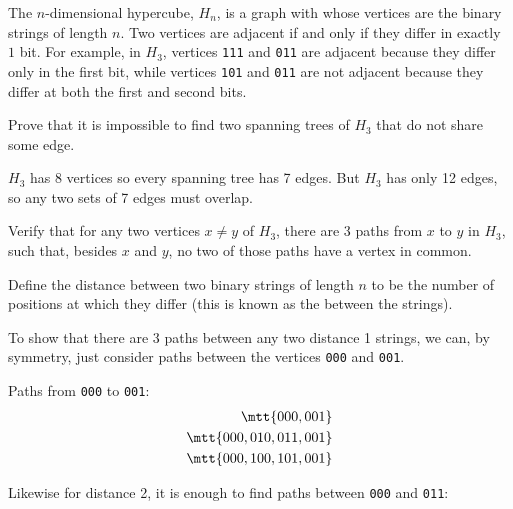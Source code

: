 
\begin{problem}

  The $n$-dimensional hypercube, $H_n$, is a graph with whose vertices are
  the binary strings of length $n$.  Two vertices are adjacent if and only
  if they differ in exactly $1$ bit.  For example, in $H_3$, vertices
  \texttt{111} and \texttt{011} are adjacent because they differ only in
  the first bit, while vertices \texttt{101} and \texttt{011} are not
  adjacent because they differ at both the first and second bits.

\iffalse
The \term{$n$-dimensional hypercube} is a graph, $H_n$, whose vertices are
the length-$n$ binary strings, with an edge between two vertices iff they
differ in only one position.  For $n=4$, for example, vertex \texttt{0000}
is adjacent to the length-4 binary strings with exactly one \texttt{1},
namely, the four strings \texttt{1000}, \texttt{0100}, \texttt{0010},
\texttt{0001}.
\fi

\bparts

\ppart Prove that it is impossible to find two spanning trees of $H_3$
that do not share some edge.

\begin{solution}
$H_3$ has 8 vertices so every spanning tree has 7 edges.  But $H_3$ has
only 12 edges, so any two sets of 7 edges must overlap.
\end{solution}

\ppart Verify that for any two vertices $x \neq y$ of $H_3$, there are $3$
paths from $x$ to $y$ in $H_3$, such that, besides $x$ and $y$, no two of
those paths have a vertex in common.

\begin{solution}
Define the distance between two binary strings of length $n$ to be the
number of positions at which they differ (this is known as the
 between the strings).

To show that there are 3 paths between any two distance 1 strings, we can,
by symmetry, just consider paths between the vertices \texttt{000} and
\texttt{001}.

Paths from \texttt{000} to \texttt{001}:
\begin{align*}
\mtt{000, 001}\\
\mtt{000, 010, 011, 001}\\
\mtt{000, 100, 101, 001}
\end{align*}

Likewise for distance 2, it is enough to find paths between
\texttt{000} and \texttt{011}:


\end{solution}
\end{problem}
